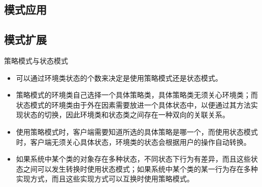 \documentclass[letterpaper,10pt,english]{sphinxmanual}
\begin{document}
\subsection{模式应用}
\label{\detokenize{behavioral_patterns/strategy:id13}}

\subsection{模式扩展}
\label{\detokenize{behavioral_patterns/strategy:id14}}
\sphinxAtStartPar
策略模式与状态模式
\begin{itemize}
\item {} 
\sphinxAtStartPar
可以通过环境类状态的个数来决定是使用策略模式还是状态模式。

\item {} 
\sphinxAtStartPar
策略模式的环境类自己选择一个具体策略类，具体策略类无须关心环境类；而状态模式的环境类由于外在因素需要放进一个具体状态中，以便通过其方法实现状态的切换，因此环境类和状态类之间存在一种双向的关联关系。

\item {} 
\sphinxAtStartPar
使用策略模式时，客户端需要知道所选的具体策略是哪一个，而使用状态模式时，客户端无须关心具体状态，环境类的状态会根据用户的操作自动转换。

\item {} 
\sphinxAtStartPar
如果系统中某个类的对象存在多种状态，不同状态下行为有差异，而且这些状态之间可以发生转换时使用状态模式；如果系统中某个类的某一行为存在多种实现方式，而且这些实现方式可以互换时使用策略模式。

\end{itemize}
\end{document}
